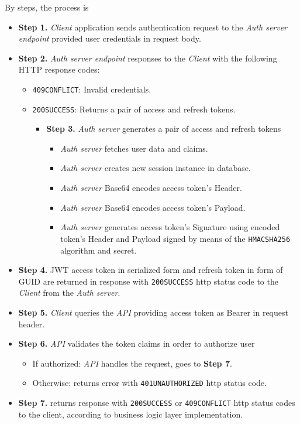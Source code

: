 By steps, the process is
\begin{itemize}
    \item \textbf{Step 1.} \textit{Client} application sends authentication request to
    the \textit{Auth server endpoint} provided user credentials in request body.
    \item \textbf{Step 2.} \textit{Auth server endpoint} responses to the \textit{Client} with the following
    HTTP response codes:
    \begin{itemize}
        \item \texttt{409CONFLICT}: Invalid credentials.
        \item \texttt{200SUCCESS}: Returns a pair of access and refresh tokens.
        \begin{itemize}
            \item \textbf{Step 3.} \textit{Auth server} generates a pair of access and refresh tokens
            \begin{itemize}
                \item \textit{Auth server} fetches user data and claims.
                \item \textit{Auth server} creates new session instance in database.
                \item \textit{Auth server} Base64 encodes access token's Header.
                \item \textit{Auth server} Base64 encodes access token's Payload.
                \item \textit{Auth server} generates access token's Signature using encoded token's
                Header and Payload signed by means of the \texttt{HMACSHA256} algorithm and secret.
            \end{itemize}
        \end{itemize}
    \end{itemize}
    \item \textbf{Step 4.} JWT access token in serialized form and refresh token in form of GUID are
    returned in response with \texttt{200SUCCESS} http status code to the \textit{Client} from the \textit{Auth server}.
    \item \textbf{Step 5.} \textit{Client} queries the \textit{API} providing access token as
    Bearer in request header.
    \item \textbf{Step 6.} \textit{API} validates the token claims in order to authorize user
    \begin{itemize}
        \item If authorized: \textit{API} handles the request, goes to \textbf{Step 7}.
        \item Otherwise: returns error with \texttt{401UNAUTHORIZED} http status code.
    \end{itemize}
    \item \textbf{Step 7.} \textit{} returns response with \texttt{200SUCCESS} or \texttt{409CONFLICT}
    http status codes to the client, according to business logic layer implementation.
\end{itemize}